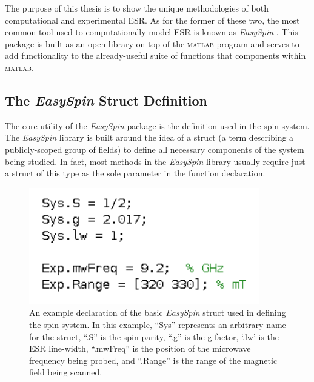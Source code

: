 \documentclass[oneside, noacknowlegments]{BYUPhys}
\begin{document}
The purpose of this thesis is to show the unique methodologies of both computational and experimental ESR. As for the former of these two, the most common tool used to computationally model ESR is known as \textit{EasySpin} \cite{RefWorks:doc:58929a02e4b0d4c09201f91b}. This package is built as an open library on top of the \textsc{matlab} program and serves to add functionality to the already-useful suite of functions that components within \textsc{matlab}.

\subsection{The \textit{EasySpin} Struct Definition}

The core utility of the \textit{EasySpin} package is the definition used in the spin system. The \textit{EasySpin} library is built around the idea of a struct (a term describing a publicly-scoped group of fields) to define all necessary components of the system being studied. In fact, most methods in the \textit{EasySpin} library usually require just a struct of this type as the sole parameter in the function declaration.

\begin{figure}[h]
    \centerline{\includegraphics{example_params_fig}}
    \caption[Simple Spin System Definition]{\label{fig:SpinDefinition}
     An example declaration of the basic \textit{EasySpin} struct used in defining the spin system. In this example, ``Sys'' represents an arbitrary name for the struct, ``.S'' is the spin parity, ``.g'' is the g-factor, `.lw' is the ESR line-width, ``.mwFreq'' is the position of the microwave frequency being probed, and ``.Range'' is the range of the magnetic field being scanned.}
 \end{figure}
\end{document}
